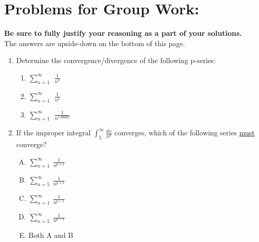 
\section*{Problems for Group Work:}
\textbf{Be sure to fully justify your reasoning as a part of your solutions.}\\
 The answers are upside-down on the bottom of this page.

\begin{enumerate}

\item Determine the convergence/divergence of the following p-series:

\begin{enumerate} \label{first}
\item \(\sum_{n=1}^\infty\ \ \frac{1}{n^3}\)

\item \(\sum_{n=1}^\infty\ \ \frac{1}{n^1}\) \label{harm}

\item \(\sum_{n=1}^\infty\ \ \frac{1}{n^{1.00001}}\) \label{00001}
\end{enumerate}

\vfill


\item If the improper integral \(\int_5^\infty \frac{dx}{x^p}\) converges, which of the following series \underline{must} converge?\label{prob4}
\begin{enumerate}[A)]
\item \(\sum_{n=1}^\infty \ \frac{1}{n^{p+1}}\)

\item \(\sum_{n=5}^\infty \ \frac{1}{n^{p+1}}\)

\item \(\sum_{n=1}^\infty \ \frac{1}{n^{p-1}}\)

\item \(\sum_{n=5}^\infty \ \frac{1}{n^{p-1}}\)

\item Both A and B


\end{enumerate}
\end{enumerate}
